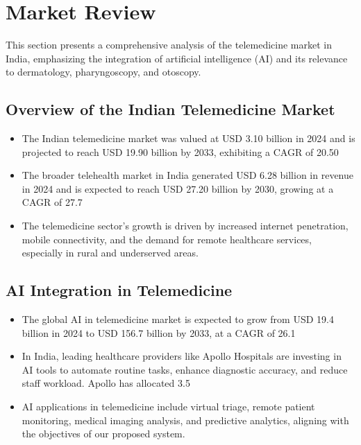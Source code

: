 \chapter{Market Review}

This section presents a comprehensive analysis of the telemedicine market in India, emphasizing the integration of artificial intelligence (AI) and its relevance to dermatology, pharyngoscopy, and otoscopy.

\section{Overview of the Indian Telemedicine Market}

\begin{itemize}
\item The Indian telemedicine market was valued at USD 3.10 billion in 2024 and is projected to reach USD 19.90 billion by 2033, exhibiting a CAGR of 20.50%
\item The broader telehealth market in India generated USD 6.28 billion in revenue in 2024 and is expected to reach USD 27.20 billion by 2030, growing at a CAGR of 27.7%
\item The telemedicine sector's growth is driven by increased internet penetration, mobile connectivity, and the demand for remote healthcare services, especially in rural and underserved areas.
\end{itemize}

\section{AI Integration in Telemedicine}

\begin{itemize}
\item The global AI in telemedicine market is expected to grow from USD 19.4 billion in 2024 to USD 156.7 billion by 2033, at a CAGR of 26.1%
\item In India, leading healthcare providers like Apollo Hospitals are investing in AI tools to automate routine tasks, enhance diagnostic accuracy, and reduce staff workload. Apollo has allocated 3.5%
\item AI applications in telemedicine include virtual triage, remote patient monitoring, medical imaging analysis, and predictive analytics, aligning with the objectives of our proposed system.
\end{itemize}

